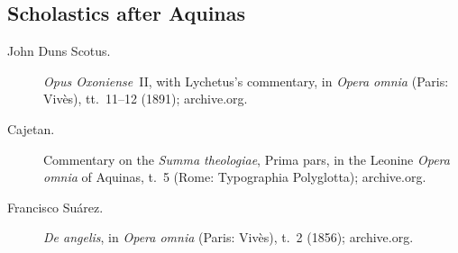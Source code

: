 \subsection*{Scholastics after Aquinas}
\begin{description}
\item[John Duns Scotus.] \emph{Opus Oxoniense}~II, with Lychetus's
  commentary, in \emph{Opera omnia} (Paris: Vivès), tt.~11--12 (1891);
  archive.org.
\item[Cajetan.] Commentary on the \emph{Summa theologiae}, Prima pars, in
  the Leonine \emph{Opera omnia} of Aquinas, t.~5 (Rome: Typographia
  Polyglotta); archive.org.
\item[Francisco Suárez.] \emph{De angelis}, in \emph{Opera omnia} (Paris:
  Vivès), t.~2 (1856); archive.org.
\end{description}

